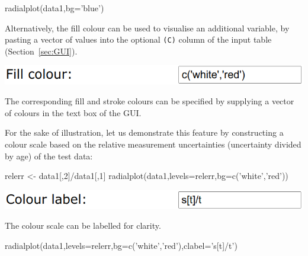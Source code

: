 \begin{refsection}
\begin{enumerate}
\begin{console}
radialplot(data1,bg='blue')
\end{console}

Alternatively, the fill colour can be used to visualise an additional
variable, by pasting a vector of values into the optional \texttt{(C)}
column of the input table (Section~\ref{sec:GUI}).

\noindent\begin{minipage}[t]{.5\linewidth}
\strut\vspace*{-\baselineskip}\newline
\includegraphics[width=\linewidth]{../figures/OtherRadialBGC.png}
\end{minipage}
\begin{minipage}[t]{.5\linewidth}
  The corresponding fill and stroke colours can be specified by
  supplying a vector of colours in the text box of the GUI.\\
\end{minipage}

For the sake of illustration, let us demonstrate this feature by
constructing a colour scale based on the relative measurement
uncertainties (uncertainty divided by age) of the test data:

\begin{script}
relerr <- data1[,2]/data1[,1]
radialplot(data1,levels=relerr,bg=c('white','red'))
\end{script}

\noindent\begin{minipage}[t]{.5\linewidth}
\strut\vspace*{-\baselineskip}\newline
\includegraphics[width=\linewidth]{../figures/OtherRadialClabel.png}
\end{minipage}
\begin{minipage}[t]{.5\linewidth}
  The colour scale can be labelled for clarity.
\end{minipage}

\begin{script}[firstnumber=2]
radialplot(data1,levels=relerr,bg=c('white','red'),clabel='s[t]/t')
\end{script}


\end{enumerate}
\end{refsection}

